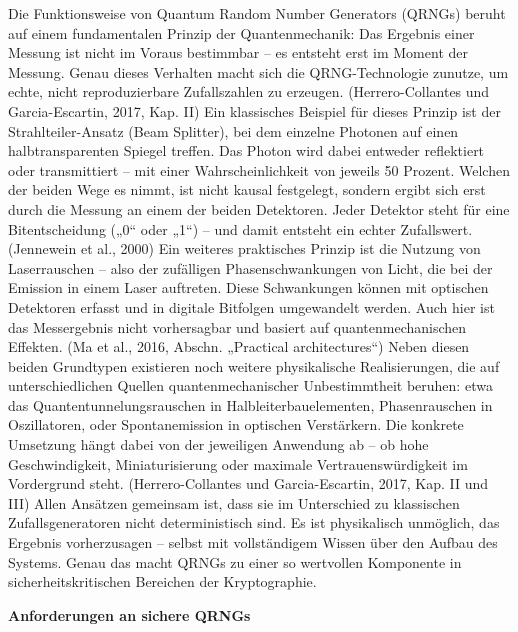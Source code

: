 \noindent
Die Funktionsweise von Quantum Random Number Generators (QRNGs) beruht auf einem fundamentalen Prinzip der Quantenmechanik: Das Ergebnis einer Messung ist nicht im Voraus bestimmbar – es entsteht erst im Moment der Messung. Genau dieses Verhalten macht sich die QRNG-Technologie zunutze, um echte, nicht reproduzierbare Zufallszahlen zu erzeugen.
 (Herrero-Collantes und Garcia-Escartin, 2017, Kap. II)
Ein klassisches Beispiel für dieses Prinzip ist der Strahlteiler-Ansatz (Beam Splitter), bei dem einzelne Photonen auf einen halbtransparenten Spiegel treffen. Das Photon wird dabei entweder reflektiert oder transmittiert – mit einer Wahrscheinlichkeit von jeweils 50 Prozent. Welchen der beiden Wege es nimmt, ist nicht kausal festgelegt, sondern ergibt sich erst durch die Messung an einem der beiden Detektoren. Jeder Detektor steht für eine Bitentscheidung („0“ oder „1“) – und damit entsteht ein echter Zufallswert.
 (Jennewein et al., 2000)
Ein weiteres praktisches Prinzip ist die Nutzung von Laserrauschen – also der zufälligen Phasenschwankungen von Licht, die bei der Emission in einem Laser auftreten. Diese Schwankungen können mit optischen Detektoren erfasst und in digitale Bitfolgen umgewandelt werden. Auch hier ist das Messergebnis nicht vorhersagbar und basiert auf quantenmechanischen Effekten.
(Ma et al., 2016, Abschn. „Practical architectures“)
Neben diesen beiden Grundtypen existieren noch weitere physikalische Realisierungen, die auf unterschiedlichen Quellen quantenmechanischer Unbestimmtheit beruhen: etwa das Quantentunnelungsrauschen in Halbleiterbauelementen, Phasenrauschen in Oszillatoren, oder Spontanemission in optischen Verstärkern. Die konkrete Umsetzung hängt dabei von der jeweiligen Anwendung ab – ob hohe Geschwindigkeit, Miniaturisierung oder maximale Vertrauenswürdigkeit im Vordergrund steht.
(Herrero-Collantes und Garcia-Escartin, 2017, Kap. II und III)
Allen Ansätzen gemeinsam ist, dass sie im Unterschied zu klassischen Zufallsgeneratoren nicht deterministisch sind. Es ist physikalisch unmöglich, das Ergebnis vorherzusagen – selbst mit vollständigem Wissen über den Aufbau des Systems. Genau das macht QRNGs zu einer so wertvollen Komponente in sicherheitskritischen Bereichen der Kryptographie.


\vspace{1em}
\noindent\textbf{Anforderungen an sichere QRNGs}

